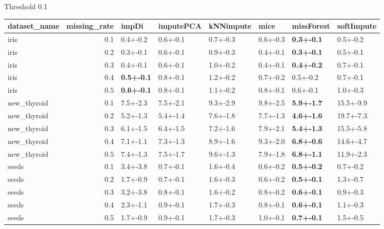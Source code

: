  Threshold 0.1 
 \begin{tabular}{lrllllll}
\toprule
dataset_name &  missing_rate &             impDi & imputePCA & kNNimpute &     mice &        missForest & softImpute \\
\midrule
        iris &           0.1 &          0.4+-0.2 &  0.6+-0.1 &  0.7+-0.3 & 0.6+-0.3 & \textbf{0.3+-0.1} &   0.5+-0.2 \\
        iris &           0.2 &          0.3+-0.1 &  0.6+-0.1 &  0.9+-0.3 & 0.4+-0.1 & \textbf{0.3+-0.1} &   0.5+-0.1 \\
        iris &           0.3 &          0.4+-0.1 &  0.6+-0.1 &  1.0+-0.2 & 0.4+-0.1 & \textbf{0.4+-0.2} &   0.7+-0.1 \\
        iris &           0.4 & \textbf{0.5+-0.1} &  0.8+-0.1 &  1.2+-0.2 & 0.7+-0.2 &          0.5+-0.2 &   0.7+-0.1 \\
        iris &           0.5 & \textbf{0.6+-0.1} &  0.8+-0.1 &  1.1+-0.2 & 0.8+-0.1 &          0.6+-0.1 &   1.0+-0.3 \\
 new_thyroid &           0.1 &          7.5+-2.3 &  7.5+-2.1 &  9.3+-2.9 & 9.8+-2.5 & \textbf{5.9+-1.7} &  15.5+-9.9 \\
 new_thyroid &           0.2 &          5.2+-1.3 &  5.4+-1.4 &  7.6+-1.8 & 7.7+-1.3 & \textbf{4.6+-1.6} &  19.7+-7.3 \\
 new_thyroid &           0.3 &          6.1+-1.5 &  6.4+-1.5 &  7.2+-1.6 & 7.9+-2.1 & \textbf{5.4+-1.3} &  15.5+-5.8 \\
 new_thyroid &           0.4 &          7.1+-1.1 &  7.3+-1.3 &  8.9+-1.6 & 9.3+-2.0 & \textbf{6.8+-0.6} &  14.6+-4.7 \\
 new_thyroid &           0.5 &          7.4+-1.3 &  7.5+-1.7 &  9.6+-1.3 & 7.9+-1.8 & \textbf{6.8+-1.1} &  11.9+-2.3 \\
       seeds &           0.1 &          3.4+-3.8 &  0.7+-0.1 &  1.6+-0.4 & 0.6+-0.2 & \textbf{0.5+-0.2} &   0.7+-0.2 \\
       seeds &           0.2 &          1.7+-0.9 &  0.7+-0.1 &  1.6+-0.3 & 0.6+-0.2 & \textbf{0.5+-0.1} &   1.3+-0.7 \\
       seeds &           0.3 &          3.2+-3.8 &  0.8+-0.1 &  1.6+-0.2 & 0.8+-0.2 & \textbf{0.6+-0.1} &   0.9+-0.3 \\
       seeds &           0.4 &          2.3+-1.1 &  0.9+-0.1 &  1.7+-0.3 & 0.8+-0.1 & \textbf{0.6+-0.1} &   1.1+-0.3 \\
       seeds &           0.5 &          1.7+-0.9 &  0.9+-0.1 &  1.7+-0.3 & 1.0+-0.1 & \textbf{0.7+-0.1} &   1.5+-0.5 \\
\bottomrule
\end{tabular}
